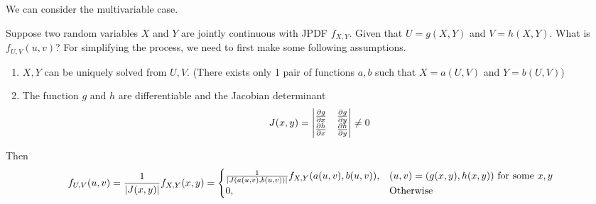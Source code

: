 \documentclass{huhtakm-template-book}
\begin{document}
    \newpage
    We can consider the multivariable case.
    \begin{eg}
        Suppose two random variables $X$ and $Y$ are jointly continuous with JPDF $f_{X,Y}$. Given that $U=g(X,Y)$ and $V=h(X,Y)$. What is $f_{U,V}(u,v)$? For simplifying the process, we need to first make some following assumptions.
        \begin{enumerate}
            \item $X,Y$ can be uniquely solved from $U,V$. (There exists only 1 pair of functions $a,b$ such that $X=a(U,V)$ and $Y=b(U,V)$)
            \item The function $g$ and $h$ are differentiable and the Jacobian determinant
            \begin{equation*}
                J(x,y)=\begin{vmatrix}
                    \pdv{g}{x} & \pdv{g}{y}\\
                    \pdv{h}{x} & \pdv{h}{y}
                \end{vmatrix}\neq 0
            \end{equation*}
        \end{enumerate}
        Then
        \begin{equation*}
            f_{U,V}(u,v)=\frac{1}{\left|{J(x,y)}\right|}f_{X,Y}(x,y)=\begin{cases}
                \frac{1}{\left|{J(a(u,v),b(u,v))}\right|}f_{X,Y}(a(u,v),b(u,v)), &(u,v)=(g(x,y),h(x,y))\text{ for some }x,y\\
                0, &\text{Otherwise}
            \end{cases}
        \end{equation*}
    \end{eg}
\end{document}
